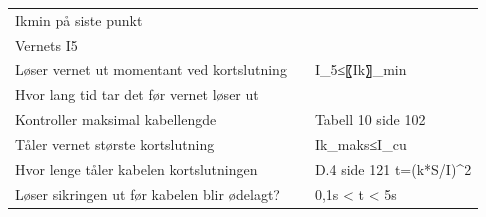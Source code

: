 \begin{center}
\begin{tabular}{| m{4cm} |m{4cm} |m{4cm} |}
Ikmin på siste punkt		& 				&								\\ \cline{1-3}
Vernets I5			& 				&								\\ \cline{1-3}
Løser vernet ut momentant ved kortslutning 			& 				&I_5≤〖Ik〗_min 						\\ \cline{1-3}
Hvor lang tid tar det før vernet løser ut			& 				& 								\\ \cline{1-3}
Kontroller maksimal kabellengde &				&Tabell 10 side 102 						\\ \cline{1-3}
Tåler vernet største kortslutning 			& 				&Ik_maks≤I_cu 							\\ \cline{1-3}
Hvor lenge tåler kabelen kortslutningen  		& 				&D.4 side 121  t=(k*S/I)^2 					\\ \cline{1-3}
Løser sikringen ut før kabelen blir ødelagt? 			& 				&0,1s < t < 5s 							\\ \cline{1-3}


		
\end{tabular}
\end{center}



